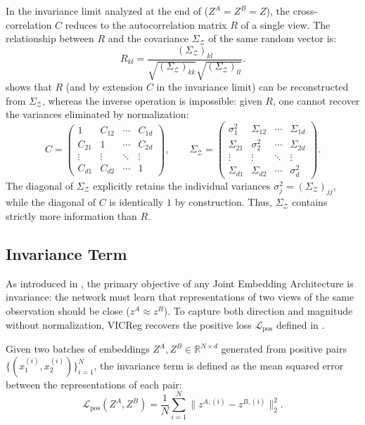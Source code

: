 \documentclass[11pt, oneside, openany]{book}
\begin{document}
In the invariance limit analyzed at the end of  ($Z^{A} = Z^{B} = Z$), the cross-correlation $C$ reduces to the autocorrelation matrix $R$ of a single view. The relationship between $R$ and the covariance $\Sigma_{\mathcal{Z}}$ of the same random vector is:
\begin{equation}
\label{eq:5.23}
R_{kl} = \frac{(\Sigma_{\mathcal{Z}})_{kl}}{\sqrt{(\Sigma_{\mathcal{Z}})_{kk}}\sqrt{(\Sigma_{\mathcal{Z}})_{ll}}}.
\end{equation}
 shows that $R$ (and by extension $C$ in the invariance limit) can be reconstructed from $\Sigma_{\mathcal{Z}}$, whereas the inverse operation is impossible: given $R$, one cannot recover the variances eliminated by normalization:
\[
C = \begin{pmatrix}
1 & C_{12} & \cdots & C_{1d} \\
C_{21} & 1 & \cdots & C_{2d} \\
\vdots & \vdots & \ddots & \vdots \\
C_{d1} & C_{d2} & \cdots & 1
\end{pmatrix}, \qquad
\Sigma_{\mathcal{Z}} = \begin{pmatrix}
\sigma_{1}^{2} & \Sigma_{12} & \cdots & \Sigma_{1d} \\
\Sigma_{21} & \sigma_{2}^{2} & \cdots & \Sigma_{2d} \\
\vdots & \vdots & \ddots & \vdots \\
\Sigma_{d1} & \Sigma_{d2} & \cdots & \sigma_{d}^{2}
\end{pmatrix}.
\]
The diagonal of $\Sigma_{\mathcal{Z}}$ explicitly retains the individual variances $\sigma_{j}^{2} = (\Sigma_{\mathcal{Z}})_{jj}$, while the diagonal of $C$ is identically $1$ by construction. Thus, $\Sigma_{\mathcal{Z}}$ contains strictly more information than $R$.

\subsection{Invariance Term}
\label{sec:5.3.2}

As introduced in , the primary objective of any Joint Embedding Architecture is invariance: the network must learn that representations of two views of the same observation should be close ($z^{A} \approx z^{B}$). To capture both direction and magnitude without normalization, VICReg recovers the positive loss $\mathcal{L}_{\text{pos}}$ defined in .

\begin{definition}
\label{def:5.4}
Given two batches of embeddings $Z^{A}, Z^{B} \in \mathbb{R}^{N \times d}$ generated from positive pairs $\{(x_{1}^{(i)}, x_{2}^{(i)})\}_{i=1}^{N}$, the invariance term is defined as the mean squared error between the representations of each pair:
\begin{equation}
\label{eq:5.24}
\mathcal{L}_{\text{pos}}(Z^{A}, Z^{B}) = \frac{1}{N}\sum_{i=1}^{N} \lVert z^{A,(i)} - z^{B,(i)} \rVert_{2}^{2}.
\end{equation}
\end{definition}
\end{document}
